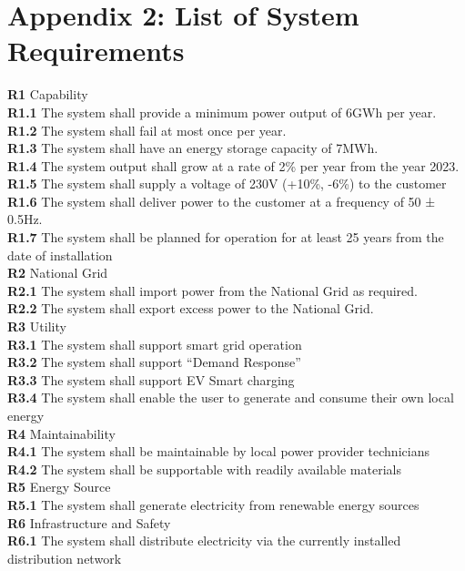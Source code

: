 \documentclass{article}
\begin{document}
\section*{Appendix 2: List of System Requirements}
\textbf{R1} Capability\\
\textbf{R1.1} The system shall provide a minimum power output of 6GWh per year.\\
\textbf{R1.2} The system shall fail at most once per year.\\
\textbf{R1.3} The system shall have an energy storage capacity of 7MWh. \\
\textbf{R1.4} The system output shall grow at a rate of 2\% per year from the year 2023.\\
\textbf{R1.5} The system shall supply a voltage of 230V (+10\%, -6\%) to the customer\\
\textbf{R1.6} The system shall deliver power to the customer at a frequency of 50 ± 0.5Hz.\\
\textbf{R1.7} The system shall be planned for operation for at least 25 years from the date of installation \\
\textbf{R2} National Grid\\
\textbf{R2.1} The system shall import power from the National Grid as required. \\
\textbf{R2.2} The system shall export excess power to the National Grid. \\
\textbf{R3} Utility\\
\textbf{R3.1} The system shall support smart grid operation\\
\textbf{R3.2} The system shall support “Demand Response” \\
\textbf{R3.3} The system shall support EV Smart charging \\
\textbf{R3.4} The system shall enable the user to generate and consume their own local energy \\
\textbf{R4} Maintainability\\
\textbf{R4.1} The system shall be maintainable by local power provider technicians \\
\textbf{R4.2} The system shall be supportable with readily available materials\\
\textbf{R5} Energy Source\\
\textbf{R5.1} The system shall generate electricity from renewable energy sources\\
\textbf{R6} Infrastructure and Safety\\
\textbf{R6.1} The system shall distribute electricity via the currently installed distribution network\\
\end{document}
